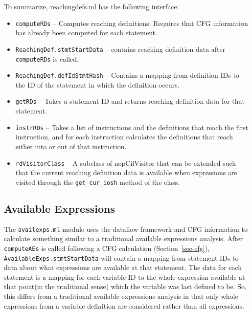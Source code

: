 \documentclass{article}
\def\secref#1{Section~\ref{sec-#1}}
\def\t#1{{\tt #1}}
\begin{document}
To summarize, reachingdefs.ml has the following interface:
\begin{itemize}
\item \t{computeRDs} -- Computes reaching definitions. Requires that
CFG information has already been computed for each statement.
\item \t{ReachingDef.stmtStartData} -- contains reaching
definition data after \t{computeRDs} is called.
\item \t{ReachingDef.defIdStmtHash} -- Contains a mapping
from definition IDs to the ID of the statement in which
the definition occurs.
\item \t{getRDs} -- Takes a statement ID and returns
reaching definition data for that statement.
\item \t{instrRDs} -- Takes a list of instructions and the
definitions that reach the first instruction, and for
each instruction calculates the definitions that reach
either into or out of that instruction.
\item \t{rdVisitorClass} -- A subclass of nopCilVisitor that
can be extended such that the current reaching definition
data is available when expressions are visited through
the \t{get\_cur\_iosh} method of the class.
\end{itemize}

\subsection{Available Expressions}

The \t{availexps.ml} module uses the dataflow framework and CFG
information to calculate something similar to a traditional available
expressions analysis. After \t{computeAEs} is called following a CFG
calculation (\secref{cfg}), \t{AvailableExps.stmtStartData} will
contain a mapping
from statement IDs to data about what expressions are available at
that statement. The data for each statement is a mapping for each
variable ID to the whole expression available at that point(in the
traditional sense) which the variable was last defined to be. So,
this differs from a traditional available expressions analysis in that
only whole expressions from a variable definition are considered rather
than all expressions.
\end{document}
